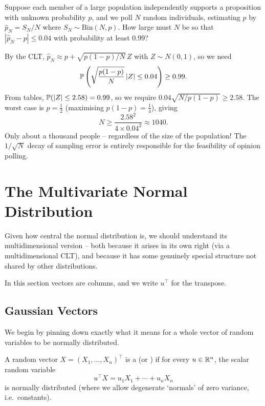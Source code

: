 \documentclass[a4paper]{scrartcl}
\begin{document}
\begin{example}
	Suppose each member of a large population independently supports a proposition with unknown probability $p$, and we poll $N$ random individuals, estimating $p$ by $\hat{p}_N = S_N/N$ where $S_N \sim \mathrm{Bin}(N, p)$. How large must $N$ be so that $|\hat p_N - p| \leq 0.04$ with probability at least $0.99$?

	By the CLT, $\hat{p}_N \approx p + \sqrt{p(1-p)/N}\, Z$ with $Z \sim N(0,1)$, so we need
	$$
	\mathbb{P}\left(\sqrt{\frac{p(1-p)}{N}}\,|Z| \leq 0.04\right) \geq 0.99.
	$$
	From tables, $\mathbb{P}(|Z| \leq 2.58) = 0.99$, so we require $0.04\sqrt{N/p(1-p)} \geq 2.58$. The worst case is $p = \frac12$ (maximising $p(1-p) = \frac14$), giving
	$$
	N \geq \frac{2.58^2}{4 \times 0.04^2} \approx 1040.
	$$
	Only about a thousand people -- regardless of the size of the population! The $1/\sqrt{N}$ decay of sampling error is entirely responsible for the feasibility of opinion polling.
\end{example}


\section{The Multivariate Normal Distribution}

Given how central the normal distribution is, we should understand its multidimensional version -- both because it arises in its own right (via a multidimensional CLT), and because it has some genuinely special structure not shared by other distributions.

In this section vectors are columns, and we write $u^\top$ for the transpose.

\subsection{Gaussian Vectors}

We begin by pinning down exactly what it means for a whole vector of random variables to be normally distributed.

\begin{definition}
	A random vector $X = (X_1, \dots, X_n)^\top$ is a  (or ) if for every $u \in \mathbb{R}^n$, the scalar random variable
	$$
	u^\top X = u_1 X_1 + \cdots + u_n X_n
	$$
	is normally distributed (where we allow degenerate `normals' of zero variance, i.e.\ constants).
\end{definition}
\end{document}
